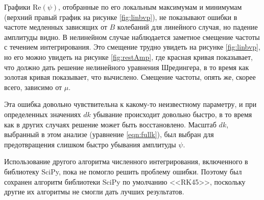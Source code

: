 \documentclass[A4,12pt,oneside]{article}
\renewcommand{\(}{\left(}
\renewcommand{\)}{\right)}
\renewcommand{\Re}{\mathrm{Re}}
\begin{document}
Графики $\Re\left(\psi\right)$, отобранные по его локальным максимумам и минимумам (верхний правый график на рисунке \ref{fig:linbvp}), не показывают ошибки в частоте медленных зависящих от $B$ колебаний для линейного случая, но падение амплитуды видно. В нелинейном случае наблюдается заметное смещение частоты с течением интегрирования. Это смещение трудно увидеть на рисунке \ref{fig:linbvp}, но его можно увидеть на рисунке \ref{fig:restAmp}, где красная кривая показывает, что должно дать решение нелинейного уравнения Шредингера, в то время как золотая кривая показывает, что вычислено. Смещение частоты, опять же, скорее всего, зависимо от $\mu$.

Эта ошибка довольно чувствительна к какому-то неизвестному параметру, и при определенных значениях $dk$ убывание происходит довольно быстро, в то время как в других случаях решение может быть восстановлено. Масштаб $dk$, выбранный в этом анализе (уравнение \ref{eqn:fullk}), был выбран для предотвращения слишком быстро убывания амплитуды $\psi$.

Использование другого алгоритма численного интегрирования, включенного в библиотеку SciPy, пока не помогло решить проблему ошибки. Поэтому был сохранен алгоритм библиотеки SciPy по умолчанию <<RK45>>, поскольку другие их алгоритмы не смогли дать лучших результатов.


\end{document}
